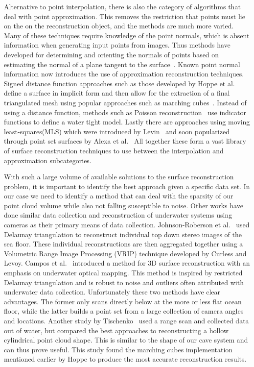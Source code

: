 Alternative to point interpolation, there is also the category of algorithms that deal with point approximation. This removes the restriction that points must lie on the on the reconstruction object, and the methods are much more varied. Many of these techniques require knowledge of the point normals, which is absent information when generating input points from images. Thus methods have developed for determining and orienting the normals of points based on estimating the normal of a plane tangent to the surface~\cite{RusuDoctoralDissertation}. Known point normal information now introduces the use of approximation reconstruction techniques. Signed distance function approaches such as those developed by Hoppe et al.~\cite{Hoppe:1992:SRU:133994.134011,Hoppe:1995:SRU:221616} define a surface in implicit form and then allow for the extraction of a final triangulated mesh using popular approaches such as marching cubes~\cite{Lorensen:1987:MCH:37401.37422}. Instead of using a distance function, methods such as Poisson reconstruction~\cite{Kazhdan:2006:PSR:1281957.1281965} use indicator functions to define a water tight model. Lastly there are approaches using moving least-squares(MLS) which were introduced by Levin~\cite{levin2004mesh} and soon popularized through point set surfaces by Alexa et al.~\cite{alexa2003computing} All together these form a vast library of surface reconstruction techniques to use between the interpolation and approximation subcategories. 

With such a large volume of available solutions to the surface reconstruction problem, it is important to identify the best approach given a specific data set. In our case we need to identify a method that can deal with the sparsity of our point cloud volume while also not falling susceptible to noise. Other works have done similar data collection and reconstruction of underwater systems using cameras as their primary means of data collection. Johnson-Roberson et al.~\cite{johnson2010generation} used Delaunay triangulation to reconstruct individual top down stereo images of the sea floor. These individual reconstructions are then aggregated together using a Volumetric Range Image Processing (VRIP) technique developed by Curless and Levoy. Campos et al.~\cite{campos2014surface} introduced a method for 3D surface reconstruction with an emphasis on underwater optical mapping. This method is inspired by restricted Delaunay triangulation and is robust to noise and outliers often attributed with underwater data collection. Unfortunately these two methods have clear advantages. The former only scans directly below at the more or less flat ocean floor, while the latter builds a point set from a large collection of camera angles and locations. Another study by Tischenko~\cite{tishchenko_2010} used a range scan and collected data out of water, but compared the best approaches to reconstructing a hollow cylindrical point cloud shape. This is similar to the shape of our cave system and can thus prove useful. This study found the marching cubes implementation mentioned earlier by Hoppe to produce the most accurate reconstruction results. 


